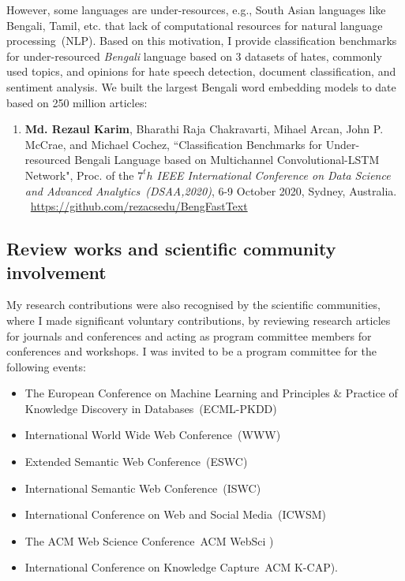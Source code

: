 \begin{appendices}
\hspace*{5mm} However, some languages are under-resources, e.g., South Asian languages like Bengali, Tamil, etc. that lack of computational resources for natural language processing~(NLP). Based on this motivation, I provide classification benchmarks for under-resourced \textit{Bengali} language based on 3 datasets of hates, commonly used topics, and opinions for hate speech detection, document classification, and sentiment analysis. We built the largest Bengali word embedding models to date based on 250 million articles:

\begin{enumerate}[noitemsep]
	\item \textbf{Md. Rezaul Karim}, Bharathi Raja Chakravarti, Mihael Arcan, John P. McCrae, and Michael Cochez, ``Classification Benchmarks for Under-resourced Bengali Language based on Multichannel Convolutional-LSTM Network", Proc. of the \emph{$7^th$ IEEE International Conference on Data Science and Advanced Analytics~(DSAA,2020)}, 6-9 October 2020, Sydney, Australia.
	\faGithub~\url{https://github.com/rezacsedu/BengFastText}
\end{enumerate}

\subsection*{Review works and scientific community involvement}%
My research contributions were also recognised by the scientific communities, where I made significant voluntary contributions, by reviewing research articles for journals and conferences and acting as program committee members for conferences and workshops. I was invited to be a program committee for the following events:

\begin{itemize}[noitemsep]
    \item The European Conference on Machine Learning and Principles \& Practice of Knowledge Discovery in Databases~(ECML-PKDD)
    \item International World Wide Web Conference~(WWW)
    \item Extended Semantic Web Conference~(ESWC) 
    \item International Semantic Web Conference~(ISWC) 
    \item International Conference on Web and Social Media~(ICWSM) 
    \item The ACM Web Science Conference~ACM WebSci )
    \item International Conference on Knowledge Capture~ACM K-CAP).
\end{itemize}


\end{appendices}
